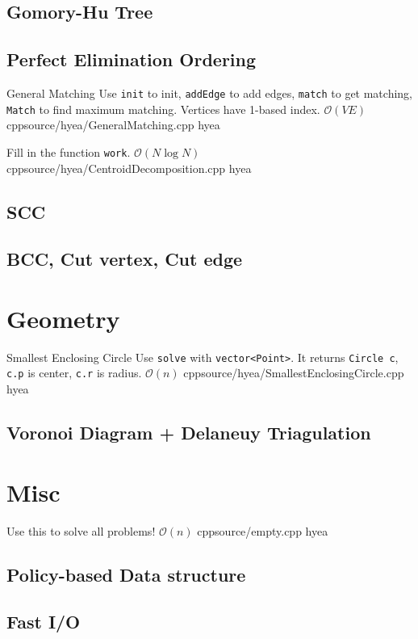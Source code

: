 \documentclass[portrait, 8pt, a4paper, oneside, twocolumn]{extarticle}
\begin{document}
\subsection{Gomory-Hu Tree}
\added

\subsection{Perfect Elimination Ordering}
\added



\Algorithm
{General Matching}
{Use \texttt{init} to init, \texttt{addEdge} to add edges, \texttt{match} to get matching, \texttt{Match} to find maximum matching. Vertices have 1-based index.}
{$\mathcal{O}(VE)$}
{cpp}{source/hyea/GeneralMatching.cpp}
{hyea}

{Fill in the function \texttt{work}.}
{$\mathcal{O}(N \log N)$}
{cpp}{source/hyea/CentroidDecomposition.cpp}
{hyea}


\subsection{SCC}
\added

\subsection{BCC, Cut vertex, Cut edge}

\added


\section{Geometry}

\Algorithm
{Smallest Enclosing Circle}
{Use \texttt{solve} with \texttt{vector<Point>}. It returns \texttt{Circle c}, \texttt{c.p} is center, \texttt{c.r} is radius.}
{$\mathcal{O}(n)$}
{cpp}{source/hyea/SmallestEnclosingCircle.cpp}
{hyea}

\subsection{Voronoi Diagram + Delaneuy Triagulation}

\added

\section{Misc}

\revised

\WIP

{Use this to solve all problems!}
{$\mathcal{O}(n)$}
{cpp}{source/empty.cpp}
{hyea}

\subsection{Policy-based Data structure}
\added

\subsection{Fast I/O}
\added
\end{document}
